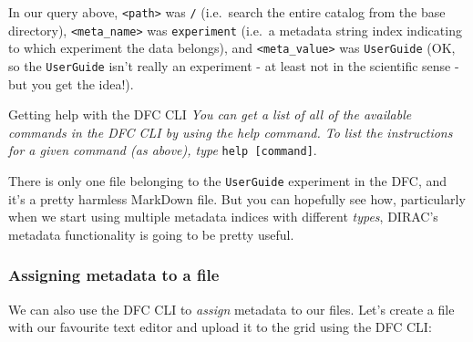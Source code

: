 In our query above, \texttt{\textless{}path\textgreater{}} was
\texttt{/} (i.e.~search the entire catalog from the base directory),
\texttt{\textless{}meta\_name\textgreater{}} was \texttt{experiment}
(i.e.~a metadata string index indicating to which experiment the data
belongs), and \texttt{\textless{}meta\_value\textgreater{}} was
\texttt{UserGuide} (OK, so the \texttt{UserGuide} isn't really an
experiment - at least not in the scientific sense - but you get the
idea!).

\begin{infobox}{Getting help with the DFC CLI}
\emph{You can get a list of all of the available commands in the DFC CLI by
using the help command. To list the instructions for a given command (as
above), type} \texttt{help {[}command{]}}.
\end{infobox}

There is only one file belonging to the \texttt{UserGuide} experiment in
the DFC, and it's a pretty harmless MarkDown file. But you can hopefully
see how, particularly when we start using multiple metadata indices with
different \emph{types}, DIRAC's metadata functionality is going to be
pretty useful.

\subsubsection{Assigning metadata to a file}
\label{assigning-metadata-to-a-file}
We can also use the DFC CLI to \emph{assign} metadata to our files.
Let's create a file with our favourite text editor and upload it to the
grid using the DFC CLI:

\begin{Shaded}
\begin{Highlighting}[]
\NormalTok{$ } 
\NormalTok{$ } 
\NormalTok{====}
\KeywordTok{*} 
\KeywordTok{*} 
\KeywordTok{*} 
\NormalTok{$ } 
 

 \NormalTok{: }
            
\NormalTok{:/}\KeywordTok{>} 
 
\end{Highlighting}
\end{Shaded}

